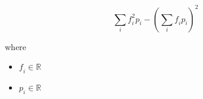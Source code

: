 \documentclass[12pt]{article}
\begin{document}
\[
\sum_\textit{i} \textit{f}_{ \textit{i} }^{2}\textit{p}_{ \textit{i} } - (\sum_\textit{i} \textit{f}_{ \textit{i} }\textit{p}_{ \textit{i} })^{2}
\]

where
\begin{itemize}
\item $\textit{f}_{\textit{i}} \in \mathbb{{R}}$
\item $\textit{p}_{\textit{i}} \in \mathbb{{R}}$
\end{itemize}
\end{document}
